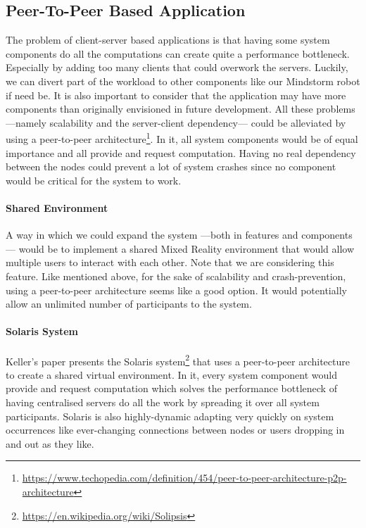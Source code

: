 \newpage
\subsection{Peer-To-Peer Based Application}
The problem of client-server based applications is that having some system components do all the computations can create quite a performance bottleneck. Especially by adding too many clients that could overwork the servers. Luckily, we can divert part of the workload to other components like our Mindstorm robot if need be. It is also important to consider that the application may have more components than originally envisioned in future development. 
\newline
All these problems ---namely scalability and the server-client dependency--- could be alleviated by using a peer-to-peer architecture\footnote{\url{https://www.techopedia.com/definition/454/peer-to-peer-architecture-p2p-architecture}}. In it, all system components would be of equal importance and all provide and request computation. Having no real dependency between the nodes could prevent a lot of system crashes since no component would be critical for the system to work.

\paragraph{Shared Environment}
A way in which we could expand the system ---both in features and components--- would be to implement a shared Mixed Reality environment that would allow multiple users to interact with each other. Note that we are considering this feature. Like mentioned above, for the sake of scalability and crash-prevention, using a peer-to-peer architecture seems like a good option. It would potentially allow an unlimited number of participants to the system.

\paragraph{Solaris System}
Keller's paper\cite{keller2002toward} presents the Solaris system\footnote{\url{https://en.wikipedia.org/wiki/Solipsis}} that uses a peer-to-peer architecture to create a shared virtual environment. In it, every system component would provide and request computation which solves the performance bottleneck of having centralised servers do all the work by spreading it over all system participants. Solaris is also highly-dynamic adapting very quickly on system occurrences like ever-changing connections between nodes or users dropping in and out as they like.
 \newpage
